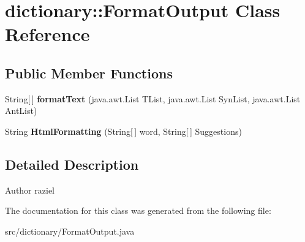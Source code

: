 \hypertarget{classdictionary_1_1_format_output}{
\section{dictionary::FormatOutput Class Reference}
\label{classdictionary_1_1_format_output}
}
\subsection*{Public Member Functions}
\begin{DoxyCompactItemize}
\item 
\hypertarget{classdictionary_1_1_format_output_a322197069b8af98932d8ef7fcce308d3}{
String\mbox{[}$\,$\mbox{]} {\bfseries formatText} (java.awt.List TList, java.awt.List SynList, java.awt.List AntList)}
\label{classdictionary_1_1_format_output_a322197069b8af98932d8ef7fcce308d3}

\item 
\hypertarget{classdictionary_1_1_format_output_a5790b394195dd6ee0fca4b5494701746}{
String {\bfseries HtmlFormatting} (String\mbox{[}$\,$\mbox{]} word, String\mbox{[}$\,$\mbox{]} Suggestions)}
\label{classdictionary_1_1_format_output_a5790b394195dd6ee0fca4b5494701746}

\end{DoxyCompactItemize}


\subsection{Detailed Description}
\begin{DoxyAuthor}{Author}
raziel 
\end{DoxyAuthor}


The documentation for this class was generated from the following file:\begin{DoxyCompactItemize}
\item 
src/dictionary/FormatOutput.java\end{DoxyCompactItemize}
